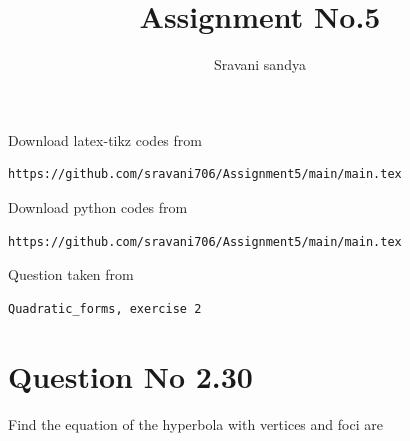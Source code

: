 \documentclass[journal,12pt,twocolumn]{IEEEtran}
\begin{document}
\makeatother
\let\StandardTheFigure\thefigure
\let\vec\mathbf
\renewcommand{\thefigure}{\theproblem}
\def\putbox#1#2#3{\makebox[0in][l]{\makebox[#1][l]{}\raisebox{\baselineskip}[0in][0in]{\raisebox{#2}[0in][0in]{#3}}}}
     \def\rightbox#1{\makebox[0in][r]{#1}}
     \def\centbox#1{\makebox[0in]{#1}}
     \def\topbox#1{\raisebox{-\baselineskip}[0in][0in]{#1}}
     \def\midbox#1{\raisebox{-0.5\baselineskip}[0in][0in]{#1}}
\vspace{3cm}
\title{Assignment No.5}
\author{Sravani sandya}
\maketitle
\newpage
\bigskip
\renewcommand{\thefigure}{\theenumi}
\renewcommand{\thetable}{\theenumi}
Download latex-tikz codes from
\begin{lstlisting}
https://github.com/sravani706/Assignment5/main/main.tex
\end{lstlisting}
%
Download python codes from
\begin{lstlisting}
https://github.com/sravani706/Assignment5/main/main.tex
\end{lstlisting}
%
Question taken from
\begin{lstlisting}
Quadratic_forms, exercise 2
\end{lstlisting}
\section{Question No 2.30}
Find the equation of the hyperbola with vertices
 and foci are 
\end{document}

